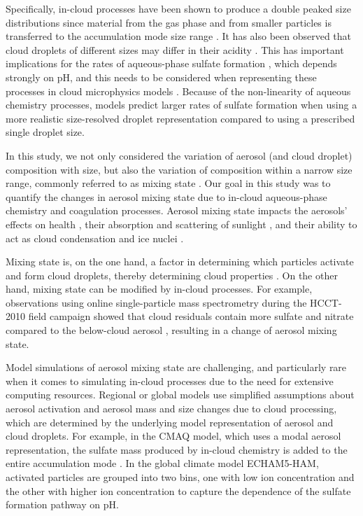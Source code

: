 \documentclass[edeposit,fullpage]{uiucthesis2009}
\begin{document}
Specifically, in-cloud processes have been shown to produce a double
peaked size distributions since material from the gas phase and from
smaller particles is transferred to the accumulation mode size range
\citep{Hoppel1986,Noble2019}. It has also been observed that cloud
droplets of different sizes may differ in their acidity
\citep{Collett1994,Pye2020}. This has important implications for the
rates of aqueous-phase sulfate formation \citep{Hoag1999}, which
depends strongly on pH, and this needs to be considered when
representing these processes in cloud microphysics models
\citep{Hegg1990,Barth2006}. Because of the non-linearity of aqueous
chemistry processes, models predict larger rates of sulfate formation
when using a more realistic size-resolved droplet representation
compared to using a prescribed single droplet size.

In this study, we not only considered the variation of aerosol (and
cloud droplet) composition with size, but also the variation of
composition within a narrow size range, commonly referred to as mixing
state \citep{Winkler1973,Riemer2019}. Our goal in this study was to
quantify the changes in aerosol mixing state due to in-cloud 
aqueous-phase chemistry and coagulation processes. Aerosol mixing state
impacts the aerosols' effects on health \citep{Ching2018}, their
absorption and scattering of sunlight \citep{Lesins2002,Fierce2020},
and their ability to act as cloud condensation and ice nuclei
\citep{Broekhuizen2006,Bhattu2015,Knopf2018}.

Mixing state is, on the one hand, a factor in determining which
  particles activate and form cloud droplets, thereby determining
  cloud properties \citep{ching2012impacts,Ching2016}. On the other hand, mixing
  state can be modified by in-cloud processes. For example,
observations using online single-particle mass spectrometry during the
HCCT-2010 field campaign showed that cloud residuals contain more
sulfate and nitrate compared to the below-cloud aerosol
\citep{Roth2016}, resulting in a change of aerosol mixing state.

Model simulations of aerosol mixing state are challenging, and
particularly rare when it comes to simulating in-cloud processes due
to the need for extensive computing resources.  Regional or global
models use simplified assumptions about aerosol activation and aerosol
mass and size changes due to cloud processing, which are determined by
the underlying model representation of aerosol and cloud droplets. For
example, in the CMAQ model, which uses a modal aerosol representation,
the sulfate mass produced by in-cloud chemistry is added to the entire
accumulation mode \citep{Ervens2015, Fahey2017}. In the global
  climate model ECHAM5-HAM, activated particles are grouped into two
  bins, one with low ion concentration and the other with higher ion
  concentration \citep{roelofs2006aerosol} to capture the dependence of
  the sulfate formation pathway on pH.
\end{document}
